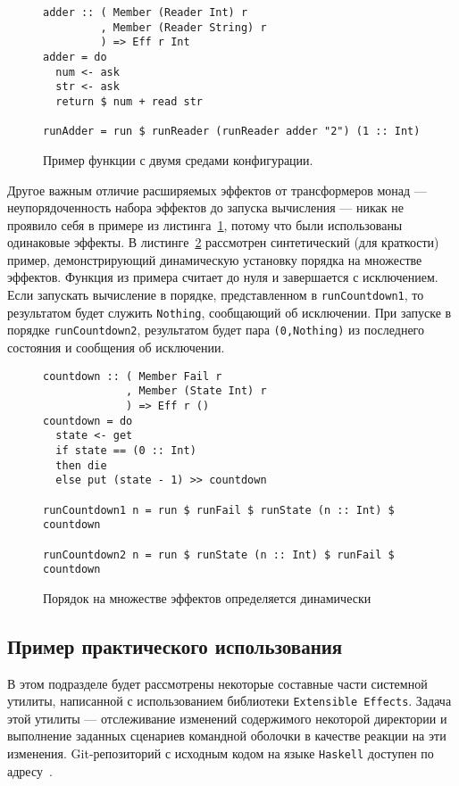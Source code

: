 \begin{figure}[t]
\begin{lstlisting}
adder :: ( Member (Reader Int) r
         , Member (Reader String) r
         ) => Eff r Int
adder = do
  num <- ask
  str <- ask
  return $ num + read str

runAdder = run $ runReader (runReader adder "2") (1 :: Int)
\end{lstlisting}
\caption{Пример функции с двумя средами конфигурации.}
\label{listing:extEff2Readers}
\end{figure}

Другое важным отличие расширяемых эффектов от трансформеров монад --- 
неупорядоченность набора эффектов до запуска вычисления --- никак не проявило 
себя в примере из листинга~\ref{listing:extEff2Readers}, потому что были 
использованы одинаковые эффекты. В листинге~\ref{listing:extEffOrdering} 
рассмотрен синтетический (для краткости) пример, демонстрирующий динамическую 
установку порядка на множестве эффектов. Функция из примера считает до нуля и 
завершается с исключением. Если запускать вычисление в порядке, представленном 
в \lstinline{runCountdown1}, то результатом будет служить \lstinline{Nothing}, 
сообщающий об исключении. При запуске в порядке \lstinline{runCountdown2}, 
результатом будет пара \lstinline{(0,Nothing)} из последнего состояния и 
сообщения об исключении.

\begin{figure}[t]
\begin{lstlisting}
countdown :: ( Member Fail r
             , Member (State Int) r
             ) => Eff r ()
countdown = do
  state <- get
  if state == (0 :: Int)
  then die
  else put (state - 1) >> countdown

runCountdown1 n = run $ runFail $ runState (n :: Int) $ countdown

runCountdown2 n = run $ runState (n :: Int) $ runFail $ countdown
\end{lstlisting}
\caption{Порядок на множестве эффектов определяется динамически}
\label{listing:extEffOrdering}
\end{figure}

\subsection{Пример практического использования}

В этом подразделе будет рассмотрены некоторые составные части системной утилиты,
написанной с использованием библиотеки \lstinline{Extensible Effects}. 
Задача этой утилиты --- отслеживание изменений содержимого некоторой директории
и выполнение заданных сценариев командной оболочки в качестве реакции на эти 
изменения. Git-репозиторий с исходным кодом на языке \lstinline{Haskell} 
доступен по адресу~\autocite{FileTrigger}.

